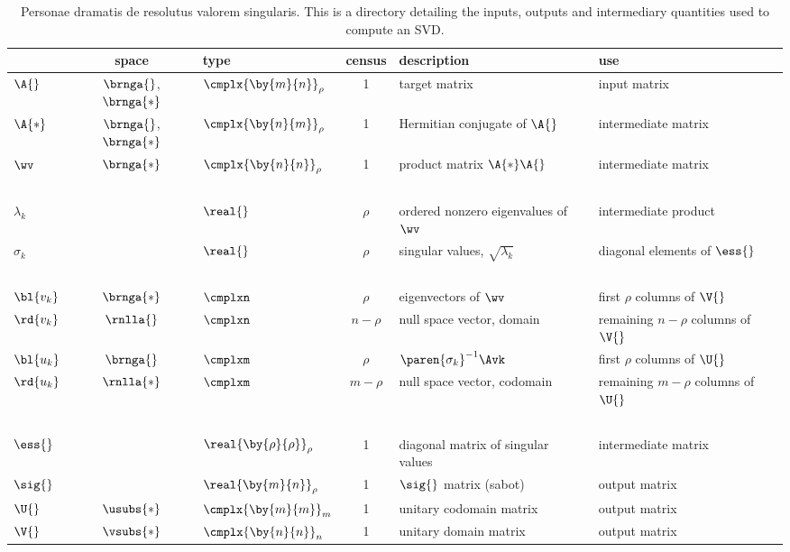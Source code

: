 \clearpage
\thispagestyle{empty}
\begin{landscape}

\begin{table}[p]
\caption[Personae dramatis de resolutus valorem singularis]{Personae dramatis de resolutus valorem singularis. This is a directory detailing the inputs, outputs and intermediary quantities used to compute an SVD.}
\begin{center}
\begin{tabular}{lclcll}
 & space & type & census & description & use \\\hline
 $\A{}$  & $\brnga{}$, $\brnga{*}$ & $\cmplx{\by{m}{n}}_{\rho}$ & 1 & target matrix  & input matrix \\
 $\A{*}$ & $\brnga{}$, $\brnga{*}$ & $\cmplx{\by{n}{m}}_{\rho}$ & 1 & Hermitian conjugate of $\A{}$ & intermediate matrix\\ 
 $\wv$ & $\brnga{*}$ & $\cmplx{\by{n}{n}}_{\rho}$ & 1 & product matrix $\A{*}\A{}$ & intermediate matrix\\
 \ &&& \\
 $\lambda_{k}$ && $\real{}$ & $\rho$ & ordered nonzero eigenvalues of $\wv$ &intermediate product \\
 $\sigma_{k}$  && $\real{}$ & $\rho$ & singular values, $\sqrt{\lambda_{k}}$ & diagonal elements of $\ess{}$\\
 \ &&& \\
 ${\bl{ v_{k} }}$ & $\brnga{*}$  & $\cmplxn$ & $\rho$ & eigenvectors of $\wv$ & first $\rho$ columns of $\V{}$ \\
 ${\rd{ v_{k} }}$ & $\rnlla{}$   & $\cmplxn$ & $n-\rho$ & null space vector, domain & remaining $n-\rho$ columns of $\V{}$ \\
 ${\bl{ u_{k} }}$ & $\brnga{}$   & $\cmplxm$ & $\rho$ & $\paren{\sigma_{k}}^{-1} \Avk$ & first $\rho$ columns of $\U{}$ \\
 ${\rd{ u_{k} }}$ & $\rnlla{*}$  & $\cmplxm$ & $m-\rho$ & null space vector, codomain & remaining $m-\rho$ columns of $\U{}$ \\
 \ &&& \\
  $\ess{}$ && $\real{\by{\rho}{\rho}}_{\rho}$ & 1 & diagonal matrix of singular values & intermediate matrix \\
  $\sig{}$ && $\real{\by{m}{n}}_{\rho}$ & 1 & $\sig{}$ matrix (sabot) & output matrix \\
  $\U{}$ & $\usubs{*}$ & $\cmplx{\by{m}{m}}_{m}$ & 1 & unitary codomain matrix & output matrix \\
  $\V{}$ & $\vsubs{*}$ & $\cmplx{\by{n}{n}}_{n}$ & 1 & unitary domain matrix & output matrix \\
\end{tabular}
\end{center}
\label{tab:personae dramatis}
\end{table}

\end{landscape}


\endinput
